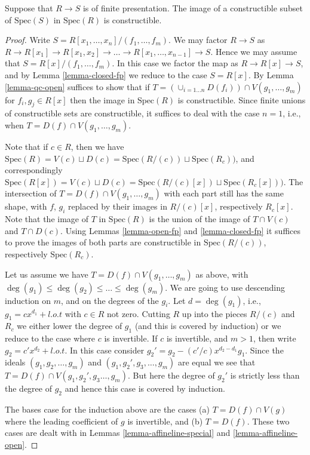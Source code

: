 \begin{theorem}
\label{theorem-chevalley}
Suppose that $R \to S$ is of finite presentation.
The image of a constructible subset of
$\text{Spec}(S)$ in $\text{Spec}(R)$ is constructible.
\end{theorem}

\begin{proof}
Write $S = R[x_1,\ldots,x_n]/(f_1,\ldots,f_m)$.
We may factor $R \to S$ as $R \to R[x_1] \to R[x_1,x_2]
\to \ldots \to R[x_1,\ldots,x_{n-1}] \to S$. Hence 
we may assume that $S = R[x]/(f_1,\ldots,f_m)$.
In this case we factor the map as $R \to R[x] \to S$,
and by Lemma \ref{lemma-closed-fp} we reduce to
the case $S = R[x]$. By Lemma \ref{lemma-qc-open} suffices
to show that if
$T = (\cup_{i=1\ldots n} D(f_i)) \cap V(g_1,\ldots,g_m)$ 
for $f_i , g_j \in R[x]$ then the image in $\text{Spec}(R)$ is
constructible. Since finite unions of constructible sets
are constructible, it suffices to deal with the case $n=1$,
i.e., when $T = D(f) \cap V(g_1,\ldots,g_m)$.

\medskip\noindent
Note that if $c \in R$, then we have $\text{Spec}(R) =
V(c) \sqcup D(c) = \text{Spec}(R/(c)) \sqcup 
\text{Spec}(R_c))$, and correspondingly $\text{Spec}(R[x]) =
V(c) \sqcup D(c) = \text{Spec}(R/(c)[x]) \sqcup 
\text{Spec}(R_c[x]))$. The intersection of $T = D(f) \cap V(g_1,\ldots,g_m)$
with each part still has the same shape, with $f$, $g_i$ replaced
by their images in $R/(c)[x]$, respectively $R_c[x]$.
Note that the image of $T$
in $\text{Spec}(R)$ is the union of the image of
$T \cap V(c)$ and $T \cap D(c)$. Using Lemmas \ref{lemma-open-fp}
and \ref{lemma-closed-fp} it suffices to prove the images of both
parts are constructible in $\text{Spec}(R/(c))$, respectively
$\text{Spec}(R_c)$.

\medskip\noindent
Let us assume we have $T = D(f) \cap V(g_1,\ldots,g_m)$
as above, with $\deg(g_1) \leq \deg(g_2) \leq \ldots \leq \deg(g_m)$.
We are going to use descending induction on $m$, and on the 
degrees of the $g_i$. Let $d = \deg(g_1)$, i.e., $g_1 = c x^{d_1} + l.o.t$
with $c \in R$ not zero. Cutting $R$ up into the pieces
$R/(c)$ and $R_c$ we either lower the degree of $g_1$ (and this
is covered by induction)
or we reduce to the case where $c$ is invertible.
If $c$ is invertible, and $m > 1$, then write
$g_2 = c' x^{d_2} + l.o.t$. In this case consider
$g_2' = g_2 - (c'/c) x^{d_2 - d_1} g_1$. Since the ideals
$(g_1, g_2, \ldots, g_m)$ and $(g_1, g_2', g_3, \ldots, g_m)$
are equal we see that $T = D(f) \cap V(g_1,g_2',g_3\ldots,g_m)$.
But here the degree of $g_2'$ is strictly less than the degree
of $g_2$ and hence this case is covered by induction.

\medskip\noindent
The bases case for the induction above are the cases
(a) $T = D(f) \cap V(g)$ where the leading coefficient
of $g$ is invertible, and (b) $T = D(f)$. These two cases
are dealt with in Lemmas \ref{lemma-affineline-special}
and \ref{lemma-affineline-open}.
\end{proof}


